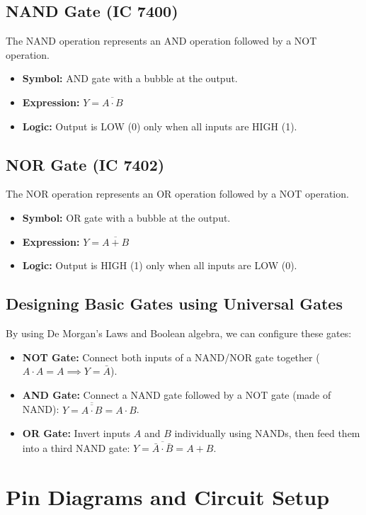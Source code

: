 \subsection{NAND Gate (IC 7400)}
The NAND operation represents an AND operation followed by a NOT operation.
\begin{itemize}
    \item \textbf{Symbol:} AND gate with a bubble at the output.
    \item \textbf{Expression:} $Y = \overline{A \cdot B}$
    \item \textbf{Logic:} Output is LOW (0) only when all inputs are HIGH (1).
\end{itemize}

\subsection{NOR Gate (IC 7402)}
The NOR operation represents an OR operation followed by a NOT operation.
\begin{itemize}
    \item \textbf{Symbol:} OR gate with a bubble at the output.
    \item \textbf{Expression:} $Y = \overline{A + B}$
    \item \textbf{Logic:} Output is HIGH (1) only when all inputs are LOW (0).
\end{itemize}

\subsection{Designing Basic Gates using Universal Gates}
By using De Morgan's Laws and Boolean algebra, we can configure these gates:
\begin{itemize}
    \item \textbf{NOT Gate:} Connect both inputs of a NAND/NOR gate together ($A \cdot A = A \implies Y = \bar{A}$).
    \item \textbf{AND Gate:} Connect a NAND gate followed by a NOT gate (made of NAND): $Y = \overline{\overline{A \cdot B}} = A \cdot B$.
    \item \textbf{OR Gate:} Invert inputs $A$ and $B$ individually using NANDs, then feed them into a third NAND gate: $Y = \overline{\bar{A} \cdot \bar{B}} = A + B$.
\end{itemize}

\section{Pin Diagrams and Circuit Setup}


